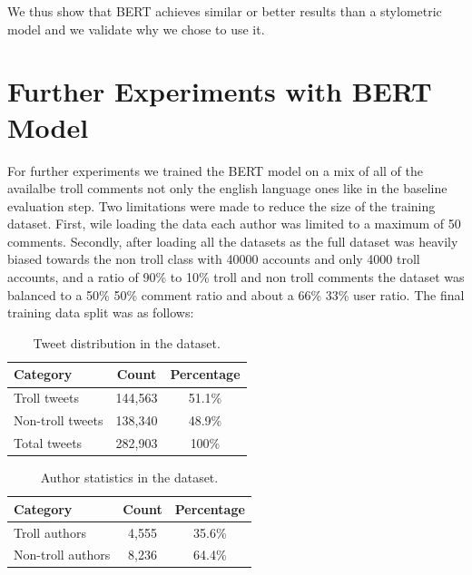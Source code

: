 \documentclass[twoside]{ctuthesis}
\theoremstyle{plain}
\theoremstyle{definition}
\theoremstyle{note}
\begin{document}
We thus show that BERT achieves similar or better results than a stylometric model and we validate why we chose to use it.

\section{Further Experiments with BERT Model}

For further experiments we trained the BERT model on a mix of all of the availalbe troll comments not only the english language ones like in the baseline evaluation step. Two limitations were made to reduce the size of the training dataset. First, wile loading the data each author was limited to a maximum of 50 comments. Secondly, after loading all the datasets  as the full dataset was heavily biased towards the non troll class with 40000 accounts and only 4000 troll accounts, and a ratio of 90\% to 10\% troll and non troll comments the dataset was balanced to a 50\% 50\% comment ratio and about a 66\% 33\% user ratio. The final training data split was as follows:

\begin{table}[ht]
    \centering
    \caption{Tweet distribution in the dataset.}
    \label{tab:tweet_distribution}
    \begin{tabular}{lcc}
        \toprule
        \textbf{Category} & \textbf{Count} & \textbf{Percentage} \\
        \midrule
        Troll tweets     & 144,563 & 51.1\% \\
        Non-troll tweets & 138,340 & 48.9\% \\
        \midrule
        Total tweets     & 282,903 & 100\% \\
        \bottomrule
    \end{tabular}
\end{table}

\begin{table}[ht]
    \centering
    \caption{Author statistics in the dataset.}
    \label{tab:author_statistics}
    \begin{tabular}{lcc}
        \toprule
        \textbf{Category} & \textbf{Count} & \textbf{Percentage} \\
        \midrule
        Troll authors     & 4,555 & 35.6\% \\
        Non-troll authors & 8,236 & 64.4\% \\
        \bottomrule
    \end{tabular}
\end{table}
\end{document}
